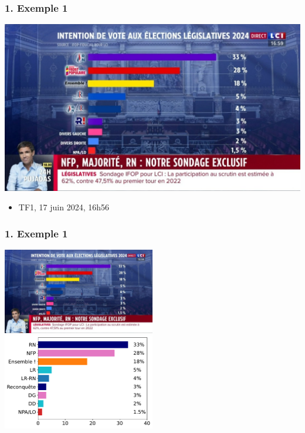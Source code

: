 \documentclass[sans,14pt]{beamer}
\begin{document}
{\begin{frame}
  \frametitle{1. Exemple 1}
  \begin{center}
    \includegraphics[width=\textwidth]{figures/jt_tf1_2024-06-17.png}
  \end{center}
  \begin{itemize}
  \item[] \footnotesize{TF1, 17 juin 2024, 16h56}
  \end{itemize}
\end{frame}

\begin{frame}
  \frametitle{1. Exemple 1}
  \begin{center}
    \includegraphics[width=0.5\textwidth]{figures/jt_tf1_2024-06-17.png}%
    \includegraphics[width=0.5\textwidth]{figures/jt_tf1_2024-06-17_fixed.pdf}
  \end{center}
\end{frame}

}
\end{document}
